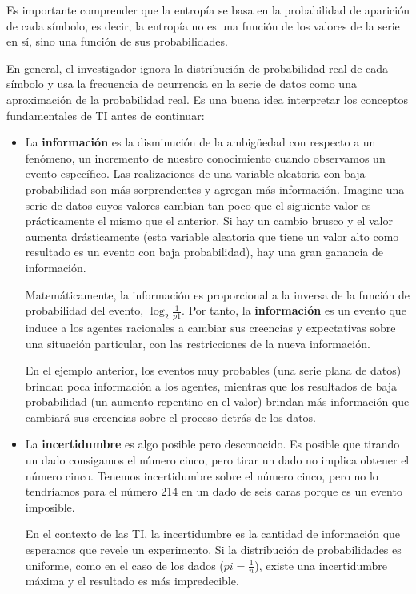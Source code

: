 \documentclass[a4paper,12pt]{article}
\begin{document}
Es importante comprender que la entropía se basa en la probabilidad de aparición de cada símbolo, es decir, la entropía no es una función de los valores de la serie en sí, sino una función de sus probabilidades. 

En general, el investigador ignora la distribución de probabilidad real de cada símbolo y usa la frecuencia de ocurrencia en la serie de datos como una aproximación de la probabilidad real. Es una buena idea interpretar los conceptos fundamentales de TI antes de continuar:

\begin{itemize}
	\item La \textbf{información} es la disminución de la ambigüedad con respecto a un fenómeno, un incremento de nuestro conocimiento cuando observamos un evento específico. Las realizaciones de una variable aleatoria con baja probabilidad son más sorprendentes y agregan más información. Imagine una serie de datos cuyos valores cambian tan poco que el siguiente valor es prácticamente el mismo que el anterior. Si hay un cambio brusco y el valor aumenta drásticamente (esta variable aleatoria que tiene un valor alto como resultado es un evento con baja probabilidad), hay una gran ganancia de información. 
	
	Matemáticamente, la información es proporcional a la inversa de la función de probabilidad del evento, $\log_2 \frac{1}{p1}$. Por tanto, la \textbf{información} es un evento que induce a los agentes racionales a cambiar sus creencias y expectativas sobre una situación particular, con las restricciones de la nueva información. 
	
	En el ejemplo anterior, los eventos muy probables (una serie plana de datos) brindan poca información a los agentes, mientras que los resultados de baja probabilidad (un aumento repentino en el valor) brindan más información que cambiará sus creencias sobre el proceso detrás de los datos. 

\item La \textbf{incertidumbre} es algo posible pero desconocido. Es posible que tirando un dado consigamos el número cinco, pero tirar un dado no implica obtener el número cinco. Tenemos incertidumbre sobre el número cinco, pero no lo tendríamos para el número 214 en un dado de seis caras porque es un evento imposible. 

En el contexto de las TI, la incertidumbre es la cantidad de información que esperamos que revele un experimento. Si la distribución de probabilidades es uniforme, como en el caso de los dados ($pi = \frac{1}{n}$), existe una incertidumbre máxima y el resultado es más impredecible. 


\end{itemize}
\end{document}
